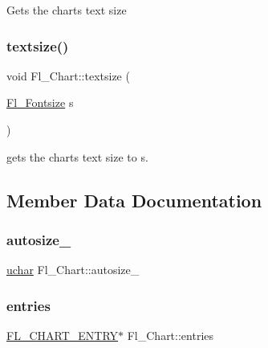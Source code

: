 Gets the chart\textquotesingle{}s text size \mbox{\label{class_fl___chart_a921349938807d1db4255bb182465461c}} 
\subsubsection{\texorpdfstring{textsize()}{textsize()}\hspace{0.1cm}{\footnotesize\ttfamily [2/2]}}
{\footnotesize\ttfamily void Fl\+\_\+\+Chart\+::textsize (\begin{DoxyParamCaption}\item[{\hyperlink{_enumerations_8_h_ad58927f5c691454480f7cd28362502f1}{Fl\+\_\+\+Fontsize}}]{s }\end{DoxyParamCaption})\hspace{0.3cm}{\ttfamily [inline]}}

gets the chart\textquotesingle{}s text size to {\ttfamily s}. 

\subsection{Member Data Documentation}
\mbox{\label{class_fl___chart_ae7cbf8e0f7915382b71a2c421fdc7c71}} 
\subsubsection{\texorpdfstring{autosize\+\_\+}{autosize\_}}
{\footnotesize\ttfamily \hyperlink{fl__types_8h_a65f85814a8290f9797005d3b28e7e5fc}{uchar} Fl\+\_\+\+Chart\+::autosize\+\_\+\hspace{0.3cm}{\ttfamily [private]}}

\mbox{\label{class_fl___chart_a3b2e0cd0705c4533ce181692d9e5f082}} 
\subsubsection{\texorpdfstring{entries}{entries}}
{\footnotesize\ttfamily \hyperlink{struct_f_l___c_h_a_r_t___e_n_t_r_y}{F\+L\+\_\+\+C\+H\+A\+R\+T\+\_\+\+E\+N\+T\+RY}$\ast$ Fl\+\_\+\+Chart\+::entries\hspace{0.3cm}{\ttfamily [private]}}

